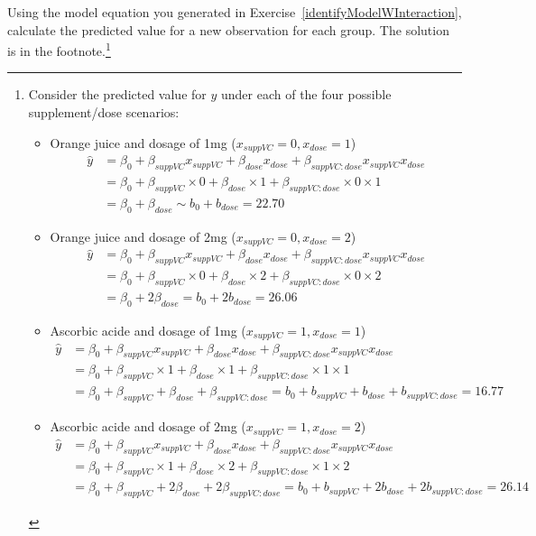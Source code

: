 \begin{exercise} \label{CalculatedPredictedMeans}
Using the model equation you generated in Exercise~\ref{identifyModelWInteraction}, calculate the predicted value for a new observation for each group. The solution is in the footnote.\footnote{Consider the predicted value for $y$ under each of the four possible supplement/dose scenarios:
\begin{itemize}
\setlength{\itemsep}{0mm}
\item Orange juice and dosage of 1mg ($x_{suppVC}=0, x_{dose}=1$)
	\begin{align*}
	\hat{y} &= \beta_0 + \beta_{suppVC}x_{suppVC} +
			\beta_{dose}x_{dose} +
			\beta_{suppVC:dose}x_{suppVC}x_{dose} \\
		&= \beta_0 + \beta_{suppVC}\times 0 +
			\beta_{dose}\times 1 +
			\beta_{suppVC:dose}\times 0\times 1 \\
		&= \beta_0 + \beta_{dose}
		\sim b_0 + b_{dose}
		= 22.70
	\end{align*}
\item Orange juice and dosage of 2mg ($x_{suppVC}=0, x_{dose}=2$)
	\begin{align*}
	\hat{y} &= \beta_0 + \beta_{suppVC}x_{suppVC} +
			\beta_{dose}x_{dose} +
			\beta_{suppVC:dose}x_{suppVC}x_{dose} \\
		&= \beta_0 + \beta_{suppVC}\times 0 +
			\beta_{dose}\times 2 +
			\beta_{suppVC:dose}\times 0\times 2 \\
		&= \beta_0 + 2\beta_{dose}
		= b_0 + 2b_{dose}
		= 26.06
	\end{align*}
\item Ascorbic acide and dosage of 1mg ($x_{suppVC}=1, x_{dose}=1$)
	\begin{align*}
	\hat{y} &= \beta_0 + \beta_{suppVC}x_{suppVC} +
			\beta_{dose}x_{dose} +
			\beta_{suppVC:dose}x_{suppVC}x_{dose} \\
		&= \beta_0 + \beta_{suppVC}\times 1 +
			\beta_{dose}\times 1 +
			\beta_{suppVC:dose}\times 1\times 1 \\
		&= \beta_0 + \beta_{suppVC} + \beta_{dose} +
			\beta_{suppVC:dose}
		= b_0 + b_{suppVC} + b_{dose} +
			b_{suppVC:dose}
		= 16.77
	\end{align*}
\item Ascorbic acide and dosage of 2mg ($x_{suppVC}=1, x_{dose}=2$)
	\begin{align*}
	\hat{y} &= \beta_0 + \beta_{suppVC}x_{suppVC} +
			\beta_{dose}x_{dose} +
			\beta_{suppVC:dose}x_{suppVC}x_{dose} \\
		&= \beta_0 + \beta_{suppVC}\times 1 +
			\beta_{dose}\times 2 +
			\beta_{suppVC:dose}\times 1\times 2 \\
		&= \beta_0 + \beta_{suppVC} + 2\beta_{dose} +
			2\beta_{suppVC:dose}
		= b_0 + b_{suppVC} + 2b_{dose} +
			2b_{suppVC:dose}
		= 26.14
	\end{align*}
\end{itemize}}
\end{exercise}

